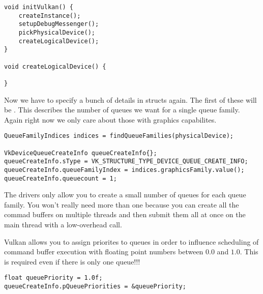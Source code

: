 \begin{center}
\begin{minipage}{0.95\linewidth}
\begin{lstlisting}
void initVulkan() {
    createInstance();
    setupDebugMessenger();
    pickPhysicalDevice();
    createLogicalDevice();
}

void createLogicalDevice() {

}
\end{lstlisting}
\end{minipage}
\end{center}

\par Now we have to specify a bunch of details in structs again. The first of these will be . This describes the number of queues we want for a single queue family. Again right now we only care about those with graphics capabilites.

\begin{center}
\begin{minipage}{0.95\linewidth}
\begin{lstlisting}
QueueFamilyIndices indices = findQueueFamilies(physicalDevice);

VkDeviceQueueCreateInfo queueCreateInfo{};
queueCreateInfo.sType = VK_STRUCTURE_TYPE_DEVICE_QUEUE_CREATE_INFO;
queueCreateInfo.queueFamilyIndex = indices.graphicsFamily.value();
queueCreateInfo.queuecount = 1;
\end{lstlisting}
\end{minipage}
\end{center}

\par The drivers only allow you to create a small number of queues for each queue family. You won't really need more than one because you can create all the commad buffers on multiple threads and then submit them all at once on the main thread with a low-overhead call. 

\par Vulkan allows you to assign priorites to queues in order to influence scheduling of command buffer execution with floating point numbers between $0.0$ and $1.0$. This is required even if there is only one queue!!!

\begin{center}
\begin{minipage}{0.95\linewidth}
\begin{lstlisting}
float queuePriority = 1.0f;
queueCreateInfo.pQueuePriorities = &queuePriority;
\end{lstlisting}
\end{minipage}
\end{center}

